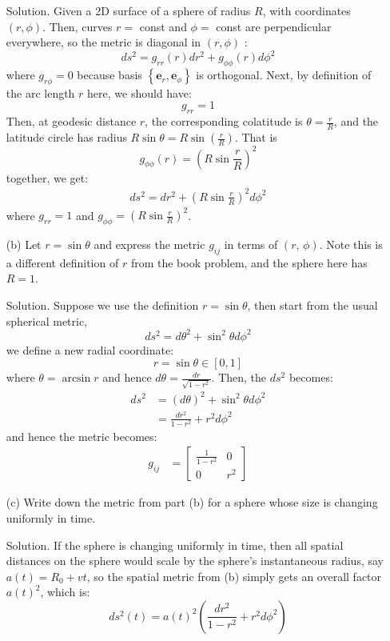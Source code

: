 \documentclass[12pt]{article}
\begin{document}
\begin{enumerate}
  \item[Solution.] Given a 2D surface of a sphere of radius $R$, with coordinates $(r, \phi)$. Then, curves $r=$ const and $\phi=$ const are perpendicular everywhere, so the metric is diagonal in $(r, \phi)$ :
  $$
  d s^2=g_{r r}(r) d r^2+g_{\phi \phi}(r) d \phi^2
  $$
  where $g_{r \phi}=0$ because basis $\left\{\mathbf{e}_r, \mathbf{e}_\phi\right\}$ is orthogonal. Next, by definition of the arc length $r$ here, we should have:
  $$g_{r r}=1$$
  Then, at geodesic distance $r$, the corresponding colatitude is $\theta=\frac{r}{R}$, and the latitude circle has radius $R \sin \theta=R \sin \left(\frac{r}{R}\right)$. That is
  $$
  g_{\phi \phi}(r)=\left(R \sin \frac{r}{R}\right)^2
  $$
  together, we get:
  $$
  \begin{aligned}
  d s^2=d r^2+\left(R \sin \frac{r}{R}\right)^2 d \phi^2
  \end{aligned}
  $$
  where $g_{r r}=1$ and $g_{\phi \phi}=\left(R \sin \frac{r}{R}\right)^2$.



    \item[(b)] Let $r=\sin\theta$ and express the metric $g_{ij}$ in terms of $(r,\,\phi)$. Note this is a different definition of $r$ from the book problem, and the sphere here has $R=1$.
  
  \item[Solution.] Suppose we use the definition $r=\sin\theta$, then start from the usual spherical metric, 
  $$d s^2=d \theta^2+\sin ^2 \theta d \phi^2$$
  we define a new radial coordinate:
  $$r=\sin \theta \in[0,1]$$
  where $\theta=\arcsin r$ and hence $d \theta=\frac{d r}{\sqrt{1-r^2}}$. Then, the $ds^2$ becomes:
  $$
  \begin{aligned}
  d s^2 & =(d \theta)^2+\sin ^2 \theta d \phi^2 \\
  & =\frac{d r^2}{1-r^2}+r^2 d \phi^2
  \end{aligned}
  $$
  and hence the metric becomes:
  $$
  \begin{aligned}
  g_{ij} & =\left[\begin{array}{cc}
  \frac{1}{1-r^2} & 0 \\
  0 & r^2
  \end{array}\right]
  \end{aligned}
  $$

    \item[(c)] Write down the metric from part (b) for a sphere whose size is changing uniformly in time.
  \item[Solution.] If the sphere is changing uniformly in time, then all spatial distances on the sphere would scale by the sphere's instantaneous radius, say $a(t)=R_0+v t$, so the spatial metric from (b) simply gets an overall factor $a(t)^2$, which is:
  $$d s^2(t)=a(t)^2\left(\frac{d r^2}{1-r^2}+r^2 d \phi^2\right)$$













\end{enumerate}
\end{document}

